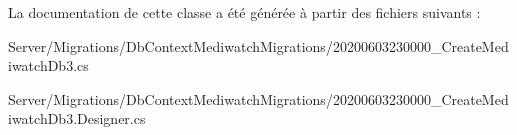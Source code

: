 La documentation de cette classe a été générée à partir des fichiers suivants \+:\begin{DoxyCompactItemize}
\item 
Server/\+Migrations/\+Db\+Context\+Mediwatch\+Migrations/20200603230000\+\_\+\+Create\+Mediwatch\+Db3.\+cs\item 
Server/\+Migrations/\+Db\+Context\+Mediwatch\+Migrations/20200603230000\+\_\+\+Create\+Mediwatch\+Db3.\+Designer.\+cs\end{DoxyCompactItemize}
